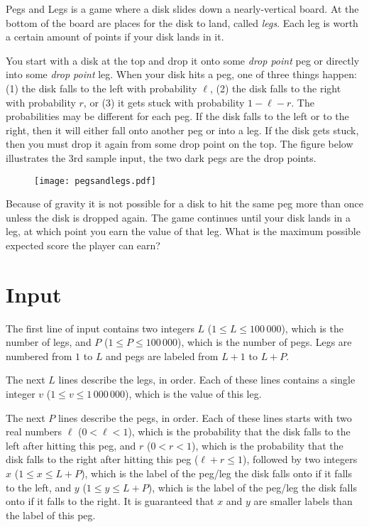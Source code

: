 
Pegs and Legs is a game where a disk slides down a nearly-vertical board.
At the bottom of the board are places for the disk to land, called \textit{legs}.
Each leg is worth a certain amount of points if your disk lands in it.

You start with a disk at the top and drop it onto some \textit{drop point}
peg or directly into some \textit{drop point} leg.
When your disk hits a peg, one of three things happen: (1) the disk falls to
the left with probability $\ell$, (2) the disk falls to the right with
probability $r$, or (3) it gets stuck with probability $1 - \ell - r$.
The probabilities may be different for each peg. If the disk falls to
the left or to the right, then it will either fall onto another peg or
into a leg. If the disk gets stuck, then you must drop it again from
some drop point on the top. The figure below illustrates the 3rd sample input,
the two dark pegs are the drop points.

\begin{figure}[h]
\begin{center}
 \texttt{[image: pegsandlegs.pdf]}
\end{center}
\end{figure}

Because of gravity it is not possible for a disk to hit the same peg
more than once unless the disk is dropped again. The game continues
until your disk lands in a leg, at which point you earn the value of
that leg. What is the maximum possible expected score the player can earn?



\section*{Input}
The first line of input contains two integers $L$
($1 \leq L \leq 100\,000$), which is the number of legs, and $P$
($1 \leq P \leq 100\,000$), which is the number of pegs. Legs
are numbered from $1$ to $L$ and pegs are labeled from $L+1$ to
$L+P$.

The next $L$ lines describe the legs, in order.
Each of these lines contains a single integer $v$ ($1 \leq v \leq 1\,000\,000$),
which is the value of this leg.

The next $P$ lines describe the pegs, in order.
Each of these lines starts with two real numbers $\ell$ ($0 < \ell < 1$),
which is the probability that the disk falls to the left after hitting this peg,
and $r$ ($0 < r < 1$), which is the probability that the disk falls
to the right after hitting this peg ($\ell + r \leq 1$), followed by two
integers $x$ ($1 \leq x \leq L+P$), which is the label of
the peg/leg the disk falls onto if it falls to the left, and $y$
($1 \leq y \leq L+P$), which is the label of the peg/leg the disk
falls onto if it falls to the right. It is guaranteed that $x$ and $y$
are smaller labels than the label of this peg.


